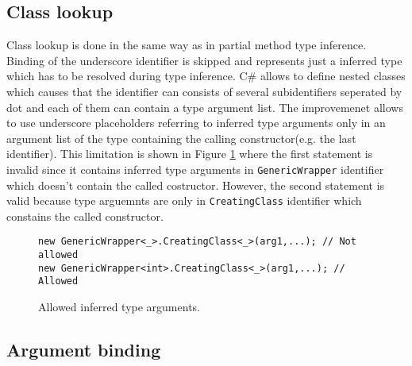 \subsection{Class lookup}

Class lookup is done in the same way as in partial method type inference.
Binding of the underscore identifier is skipped and represents just a inferred type which has to be resolved during type inference.
C\# allows to define nested classes which causes that the identifier can consists of several subidentifiers seperated by dot and each of them can contain a type argument list.
The improvemenet allows to use underscore placeholders referring to inferred type arguments only in an argument list of the type containing the calling constructor(e.g. the last identifier).
This limitation is shown in Figure \ref{img59:TypeArgList} where the first statement is invalid since it contains inferred type arguments in \texttt{GenericWrapper} identifier which doesn't contain the called costructor.
However, the second statement is valid because type arguemnts are only in \texttt{CreatingClass} identifier which constains the called constructor.
\begin{figure}[h!]
\begin{lstlisting}[style=csharp, mathescape=true]
new GenericWrapper<_>.CreatingClass<_>(arg1,...); // Not allowed
new GenericWrapper<int>.CreatingClass<_>(arg1,...); // Allowed
\end{lstlisting}
\caption{Allowed inferred type arguments.}
\label{img59:TypeArgList}
\end{figure}

\subsection{Argument binding}

